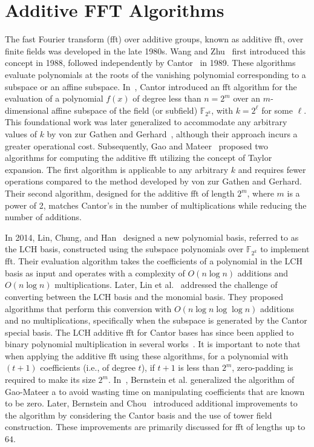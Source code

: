 \section{Additive FFT Algorithms}
The fast Fourier transform (\gls{fft}) over additive groups, known as additive \gls{fft}, over finite fields was developed in the late 1980s. Wang and Zhu~\cite{WangZhu1988} first introduced this concept in 1988, followed independently by Cantor~\cite{Cantor1989FFT} in 1989. These algorithms evaluate polynomials at the roots of the vanishing polynomial corresponding to a subspace or an affine subspace. In~\cite{Cantor1989FFT}, Cantor introduced an \gls{fft} algorithm for the evaluation of a polynomial $f(x)$ of degree less than $n = 2^m$ over an $m$-dimensional affine subspace of the field (or subfield) $\mathbb{F}_{2^k}$, with $k = 2^\ell$ for some $\ell$. This foundational work was later generalized to accommodate any arbitrary values of $k$ by von zur Gathen and Gerhard~\cite{zurGathenFFT}, although their approach incurs a greater operational cost. Subsequently, Gao and Mateer~\cite{Gao2010FFT} proposed two algorithms for computing the additive \gls{fft} utilizing the concept of Taylor expansion. The first algorithm is applicable to any arbitrary $k$ and requires fewer operations compared to the method developed by von zur Gathen and Gerhard. Their second algorithm, designed for the additive \gls{fft} of length $2^m$, where $m$ is a power of 2, matches Cantor’s in the number of multiplications while reducing the number of additions. 


In 2014, Lin, Chung, and Han~\cite{LCH-basis2014} designed a new polynomial basis, referred to as the LCH basis, constructed using the subspace polynomials over $\mathbb{F}_{2^k}$ to implement \gls{fft}. Their evaluation algorithm takes the coefficients of a polynomial in the LCH basis as input and operates with a complexity of $O(n \log n)$ additions and $O(n \log n)$ multiplications. Later, Lin et al.~\cite{LCH-conv2016} addressed the challenge of converting between the LCH basis and the monomial basis. They proposed algorithms that perform this conversion with $O(n \log n \log \log n)$ additions and no multiplications, specifically when the subspace is generated by the Cantor special basis. The LCH additive \gls{fft} for Cantor bases has since been applied to binary polynomial multiplication in several works~\cite{LCH-Fast_Mult2018,LCH-Frobenius2018}. It is important to note that when applying the additive \gls{fft} using these algorithms, for a polynomial with $(t+1)$ coefficients (i.e., of degree $t$), if $t+1$ is less than $2^m$, zero-padding is required to make its size $2^m$. In~\cite{BernsteinChouSchwabe2013}, Bernstein et al. generalized the algorithm of Gao-Mateer a to avoid wasting time on manipulating coefficients that are known to be zero. Later, Bernstein and Chou~\cite{BernsteinChou2014} introduced additional improvements to the algorithm by considering the Cantor basis and the use of tower field construction. These improvements are primarily discussed for \gls{fft} of lengths up to $64$.



